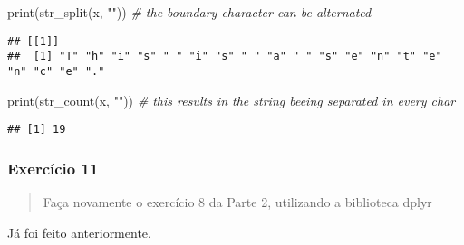\documentclass[
]{article}
\newenvironment{Shaded}{\begin{snugshade}}{\end{snugshade}}
\newcommand{\CommentTok}[1]{\textcolor[rgb]{0.56,0.35,0.01}{\textit{#1}}}
\newcommand{\FunctionTok}[1]{\textcolor[rgb]{0.00,0.00,0.00}{#1}}
\newcommand{\NormalTok}[1]{#1}
\newcommand{\StringTok}[1]{\textcolor[rgb]{0.31,0.60,0.02}{#1}}
\begin{document}
\begin{Shaded}
\begin{Highlighting}[]
\FunctionTok{print}\NormalTok{(}\FunctionTok{str\_split}\NormalTok{(x, }\StringTok{""}\NormalTok{)) }\CommentTok{\# the boundary character can be alternated}
\end{Highlighting}
\end{Shaded}

\begin{verbatim}
## [[1]]
##  [1] "T" "h" "i" "s" " " "i" "s" " " "a" " " "s" "e" "n" "t" "e" "n" "c" "e" "."
\end{verbatim}

\begin{Shaded}
\begin{Highlighting}[]
\FunctionTok{print}\NormalTok{(}\FunctionTok{str\_count}\NormalTok{(x, }\StringTok{""}\NormalTok{)) }\CommentTok{\# this results in the string beeing separated in every char}
\end{Highlighting}
\end{Shaded}

\begin{verbatim}
## [1] 19
\end{verbatim}

\hypertarget{exercuxedcio-11}{%
\subsubsection{Exercício 11}\label{exercuxedcio-11}}

\begin{quote}
Faça novamente o exercício 8 da Parte 2, utilizando a biblioteca dplyr
\end{quote}

Já foi feito anteriormente.
\end{document}
